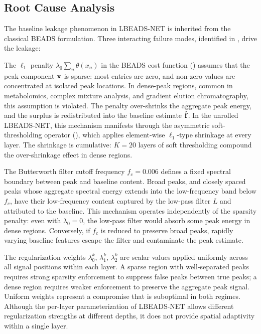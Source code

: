 \subsection{Root Cause Analysis}
\label{sec:disc_leakage_root}

The baseline leakage phenomenon in LBEADS-NET is inherited from the classical BEADS formulation. Three interacting failure modes, identified in , drive the leakage:

The $\ell_1$ penalty $\lambda_0 \sum_n \theta(x_n)$ in the BEADS cost function () assumes that the peak component $\mathbf{x}$ is sparse: most entries are zero, and non-zero values are concentrated at isolated peak locations. In dense-peak regions, common in metabolomics, complex mixture analysis, and gradient elution chromatography, this assumption is violated. The penalty over-shrinks the aggregate peak energy, and the surplus is redistributed into the baseline estimate $\hat{\mathbf{f}}$. In the unrolled LBEADS-NET, this mechanism manifests through the asymmetric soft-thresholding operator (), which applies element-wise $\ell_1$-type shrinkage at every layer. The shrinkage is cumulative: $K = 20$ layers of soft thresholding compound the over-shrinkage effect in dense regions.

The Butterworth filter cutoff frequency $f_c = 0.006$ defines a fixed spectral boundary between peak and baseline content. Broad peaks, and closely spaced peaks whose aggregate spectral energy extends into the low-frequency band below $f_c$, have their low-frequency content captured by the low-pass filter $L$ and attributed to the baseline. This mechanism operates independently of the sparsity penalty: even with $\lambda_0 = 0$, the low-pass filter would absorb some peak energy in dense regions. Conversely, if $f_c$ is reduced to preserve broad peaks, rapidly varying baseline features escape the filter and contaminate the peak estimate.

The regularization weights $\lambda_0^k$, $\lambda_1^k$, $\lambda_2^k$ are scalar values applied uniformly across all signal positions within each layer. A sparse region with well-separated peaks requires strong sparsity enforcement to suppress false peaks between true peaks; a dense region requires weaker enforcement to preserve the aggregate peak signal. Uniform weights represent a compromise that is suboptimal in both regimes. Although the per-layer parameterization of LBEADS-NET allows different regularization strengths at different depths, it does not provide spatial adaptivity within a single layer.

